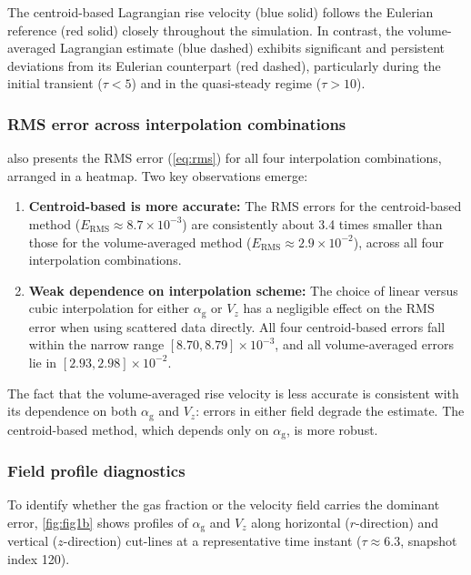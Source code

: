 \documentclass[11pt,a4paper]{article}
\newcommand{\alphag}{\alpha_{\mathrm{g}}}
\newcommand{\Vz}{V_z}
\newcommand{\ERMS}{E_{\mathrm{RMS}}}
\begin{document}
The centroid-based Lagrangian rise velocity (blue solid) follows the
Eulerian reference (red solid) closely throughout the simulation.  In
contrast, the volume-averaged Lagrangian estimate (blue dashed) exhibits
significant and persistent deviations from its Eulerian counterpart (red
dashed), particularly during the initial transient ($\tau < 5$) and in the
quasi-steady regime ($\tau > 10$).

\subsubsection{RMS error across interpolation combinations}

 also presents the RMS error (\cref{eq:rms}) for all four
interpolation combinations, arranged in a heatmap.  Two key observations
emerge:

\begin{enumerate}[label=(\arabic*)]
  \item \textbf{Centroid-based is more accurate:} The RMS errors for the
    centroid-based method ($\ERMS \approx 8.7 \times 10^{-3}$) are
    consistently about 3.4 times smaller than those for the volume-averaged
    method ($\ERMS \approx 2.9 \times 10^{-2}$), across all four
    interpolation combinations.
  \item \textbf{Weak dependence on interpolation scheme:} The choice of
    linear versus cubic interpolation for either $\alphag$ or $\Vz$ has a
    negligible effect on the RMS error when using scattered data directly.
    All four centroid-based errors fall within the narrow range
    $[8.70, 8.79] \times 10^{-3}$, and all volume-averaged errors lie in
    $[2.93, 2.98] \times 10^{-2}$.
\end{enumerate}

The fact that the volume-averaged rise velocity is less accurate is
consistent with its dependence on both $\alphag$ and $\Vz$: errors in
either field degrade the estimate.  The centroid-based method, which depends
only on $\alphag$, is more robust.

\subsubsection{Field profile diagnostics}

To identify whether the gas fraction or the velocity field carries the
dominant error, \cref{fig:fig1b} shows profiles of $\alphag$ and $\Vz$
along horizontal ($r$-direction) and vertical ($z$-direction) cut-lines at a
representative time instant ($\tau \approx 6.3$, snapshot index 120).
\end{document}

